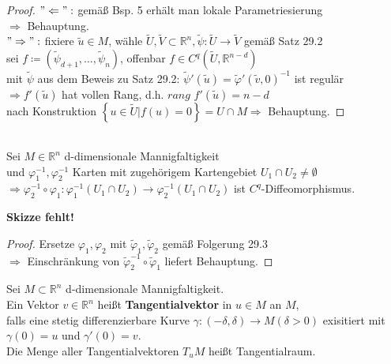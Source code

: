 \begin{proof}
$"\Leftarrow":$ gemäß Bsp. 5 erhält man lokale Parametriesierung \\
$\Rightarrow$ Behauptung. \\
$"\Rightarrow":$ fixiere $\tilde{u} \in M$, 
wähle $\tilde{U}, \tilde{V} \subset \mathbb{R}^n, 
\tilde{\psi}: \tilde{U} \rightarrow \tilde{V} $ gemäß Satz 29.2 \\
sei $f \coloneqq \left( \tilde{\psi}_{d+1}, \ldots , \tilde{\psi}_n \right)$,
offenbar $f \in C^q \left(  \tilde{U}, \mathbb{R}^{n-d} \right) $ \\
mit $\tilde{\psi}$ aus dem Beweis zu Satz 29.2:
$\tilde{\psi}' (\tilde{u}) = \tilde{\varphi}' (\tilde{v}, 0)^{-1} $ ist regulär \\
$\Rightarrow f'(\tilde{u}) $ hat vollen Rang, d.h. $\textit{rang } f'(\tilde{u}) = n-d $ \\
nach Konstruktion $ \left\lbrace u \in \tilde{U} | f(u) = 0 \right\rbrace = U \cap M
\Rightarrow $ Behauptung.
\end{proof}

\begin{lem}[Kartenwechsel] 
\mbox{} \\
Sei $M \in \mathbb{R}^n $ d-dimensionale Mannigfaltigkeit \\
und $\varphi_1^{-1}, \varphi_2^{-1} $ Karten mit zugehörigem Kartengebiet 
$U_1 \cap U_2 \neq \emptyset $ \\
$\Longrightarrow 
\varphi_2^{-1} \circ \varphi_1 : \varphi_1^{-1} \left( U_1 \cap U_2 \right)
\rightarrow \varphi_2^{-1} \left( U_1 \cap U_2 \right) $ ist $C^q$-Diffeomorphismus.

\textbf{Skizze fehlt!}
\end{lem}

\begin{proof}
Ersetze $\varphi_1, \varphi_2 $ mit $\tilde{\varphi}_1, \tilde{\varphi}_2 $
gemäß Folgerung 29.3 \\
$\Rightarrow$ Einschränkung von $\tilde{\varphi}_2^{-1} \circ \tilde{\varphi}_1 $
liefert Behauptung. 
\end{proof}

\begin{definition}
Sei $M \subset \mathbb{R}^n $ d-dimensionale Mannigfaltigkeit. \\
Ein Vektor $v \in \mathbb{R}^n $ heißt \textbf{Tangentialvektor} in $u \in M $ an $M$, \\
falls eine stetig differenzierbare Kurve 
$\gamma: (-\delta, \delta) \rightarrow M (\delta > 0) $ exisitiert mit \\
$\gamma (0) = u $ und $\gamma' (0) = v $. \\
Die Menge aller Tangentialvektoren $T_uM$ heißt Tangentialraum.
\end{definition}

